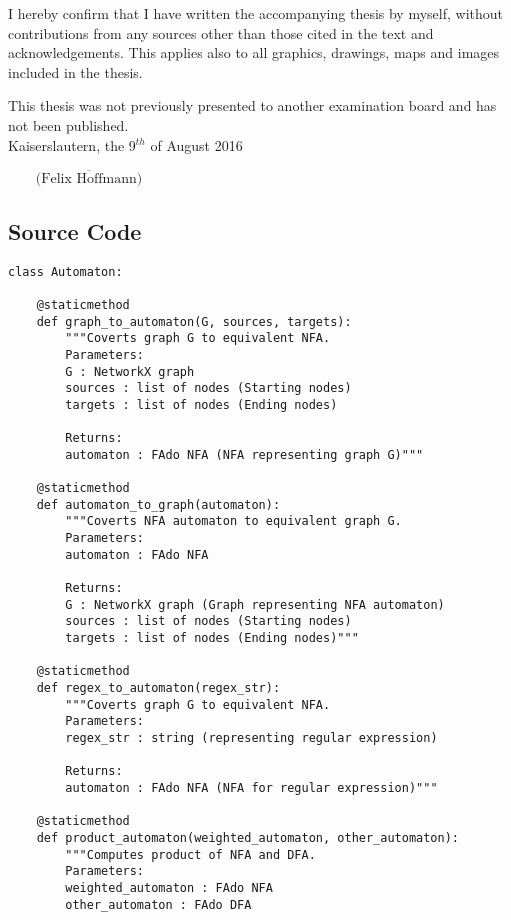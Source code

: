 \documentclass[]{article}
\numberwithin{equation}{section}
\begin{document}
I hereby confirm that I have written the accompanying thesis by myself, without contributions from any sources other than those cited in the text and acknowledgements. This applies also to all graphics, drawings, maps and images included in the thesis.

This thesis was not previously presented to another examination board and has not been published. \\[2ex] 

\noindent Kaiserslautern, the 9$^{th}$ of August 2016
\begin{flushright}
	$\overline{~~~~~~~~~\mbox{(Felix Hoffmann)}~~~~~~~~~}$
\end{flushright}


\newpage

\begin{appendices}
\setcounter{table}{0}
\renewcommand{\thetable}{B\arabic{table}}
\captionsetup[figure]{list=no}
\captionsetup[table]{list=no}

\section{Source Code}
\label{app:code}

\begin{lstlisting}
class Automaton:

	@staticmethod
	def graph_to_automaton(G, sources, targets):
		"""Coverts graph G to equivalent NFA.
		Parameters:
		G : NetworkX graph
		sources : list of nodes (Starting nodes)
		targets : list of nodes (Ending nodes)
		
		Returns:
		automaton : FAdo NFA (NFA representing graph G)"""

	@staticmethod
	def automaton_to_graph(automaton):
		"""Coverts NFA automaton to equivalent graph G.
		Parameters:
		automaton : FAdo NFA
		
		Returns:
		G : NetworkX graph (Graph representing NFA automaton)
		sources : list of nodes (Starting nodes)
		targets : list of nodes (Ending nodes)"""
	
	@staticmethod
	def regex_to_automaton(regex_str):
		"""Coverts graph G to equivalent NFA.
		Parameters:
		regex_str : string (representing regular expression)
		
		Returns:
		automaton : FAdo NFA (NFA for regular expression)"""
	
	@staticmethod
	def product_automaton(weighted_automaton, other_automaton):
		"""Computes product of NFA and DFA.
		Parameters:
		weighted_automaton : FAdo NFA
		other_automaton : FAdo DFA
		

\end{lstlisting}
\end{appendices}
\end{document}
